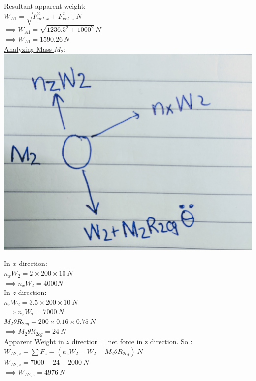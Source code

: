 \documentclass{article}
\begin{document}
\noindent Resultant apparent weight: \\
$W_{A1}= \sqrt{F_{net,x}^2+ F_{net,z}^2}\ N$\\
$\implies W_{A1}= \sqrt{1236.5^2+ 1000^2}\ N$\\
$\implies W_{A1}= 1590.26\ N$\\

\noindent \underline{Analyzing Mass $M_2$}:\\

\includegraphics[scale=0.05]{m2.jpg}

\noindent In $x$ direction:\\

\noindent $n_xW_2 = 2 \times 200 \times 10\ N$\\
$\implies n_xW_2= 4000 N $\\

\noindent In $z$ direction: \\

\noindent $n_zW_2= 3.5 \times 200 \times 10\ N$\\
$\implies n_zW_2 = 7000\ N$\\

\noindent $M_2\ddot{\theta}R_{2cg}=200 \times 0.16 \times 0.75\ N $\\
$\implies M_2\ddot{\theta}R_{2cg}= 24\ N $\\

\noindent Apparent Weight in $z$ direction = net force in z direction. So : \\
$W_{A2,z}=\sum F_z = (n_zW_2-W_2- M_2\ddot{\theta}R_{2cg})\ N$\\
$W_{A2,z}= 7000-24-2000 \ N$\\
$\implies W_{A2,z}= 4976\ N$\\
\end{document}
